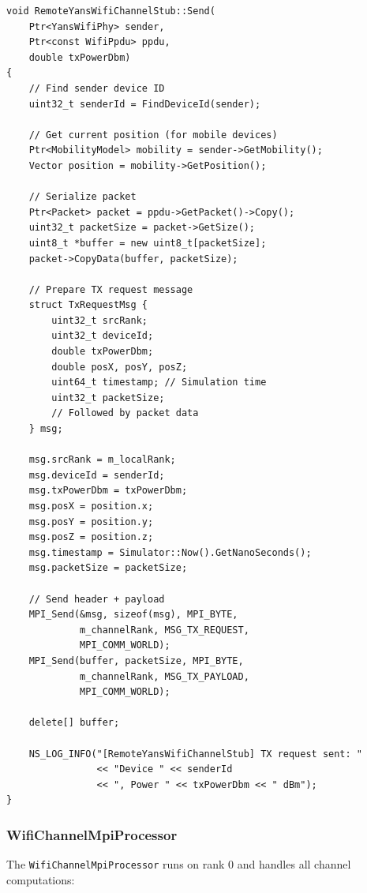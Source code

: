 \begin{lstlisting}[style=cpp, caption={Transmission request serialization}]
void RemoteYansWifiChannelStub::Send(
    Ptr<YansWifiPhy> sender,
    Ptr<const WifiPpdu> ppdu,
    double txPowerDbm)
{
    // Find sender device ID
    uint32_t senderId = FindDeviceId(sender);
    
    // Get current position (for mobile devices)
    Ptr<MobilityModel> mobility = sender->GetMobility();
    Vector position = mobility->GetPosition();
    
    // Serialize packet
    Ptr<Packet> packet = ppdu->GetPacket()->Copy();
    uint32_t packetSize = packet->GetSize();
    uint8_t *buffer = new uint8_t[packetSize];
    packet->CopyData(buffer, packetSize);
    
    // Prepare TX request message
    struct TxRequestMsg {
        uint32_t srcRank;
        uint32_t deviceId;
        double txPowerDbm;
        double posX, posY, posZ;
        uint64_t timestamp; // Simulation time
        uint32_t packetSize;
        // Followed by packet data
    } msg;
    
    msg.srcRank = m_localRank;
    msg.deviceId = senderId;
    msg.txPowerDbm = txPowerDbm;
    msg.posX = position.x;
    msg.posY = position.y;
    msg.posZ = position.z;
    msg.timestamp = Simulator::Now().GetNanoSeconds();
    msg.packetSize = packetSize;
    
    // Send header + payload
    MPI_Send(&msg, sizeof(msg), MPI_BYTE,
             m_channelRank, MSG_TX_REQUEST,
             MPI_COMM_WORLD);
    MPI_Send(buffer, packetSize, MPI_BYTE,
             m_channelRank, MSG_TX_PAYLOAD,
             MPI_COMM_WORLD);
    
    delete[] buffer;
    
    NS_LOG_INFO("[RemoteYansWifiChannelStub] TX request sent: "
                << "Device " << senderId 
                << ", Power " << txPowerDbm << " dBm");
}
\end{lstlisting}

\subsubsection{WifiChannelMpiProcessor}

The \texttt{WifiChannelMpiProcessor} runs on rank 0 and handles all channel computations:

